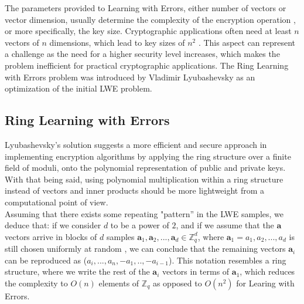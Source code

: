 \documentclass[11pt,
  titlepage=false,
  abstract=on,
]{scrreprt}
\begin{document}
The parameters provided to Learning with Errors, either number of vectors or vector dimension, usually determine the complexity of the encryption operation \cite{micciancio2013hardness}, or more specifically, the key size. 
Cryptographic applications often need at least  $n$ vectors of $n$ dimensions, which lead to key sizes of $n^2$ \cite{regev2010learning}. This aspect can represent a challenge as the need for a higher 
security level increases, which makes the problem inefficient for practical cryptographic applications.
The Ring Learning with Errors problem \cite{lyubashevsky2010ideal} was introduced by Vladimir Lyubashevsky as an optimization of the initial LWE problem.


\subsection{Ring Learning with Errors}
Lyubashevsky's solution \cite{lyubashevsky2010ideal} suggests a more efficient and secure approach in implementing encryption algorithms by applying the ring structure over a finite field of moduli, onto the polynomial representation 
of public and private keys. With that being said, using polynomial multiplication within a ring structure instead of vectors and inner products should be more lightweight from a computational point of view.\\

Assuming that there exists some repeating "pattern'' in the LWE samples, we deduce that: if we consider $d$ to be a power of $2$, and if we assume that the $\mathbf{a}$ vectors arrive in blocks of $d$ samples
$\mathbf{a}_1, \mathbf{a}_2,..., \mathbf{a}_d \in \mathbb{Z}^d_q$, where $\mathbf{a}_1 = a_1, a_2,..., a_d$ is still chosen uniformly at random , we can conclude that the remaining vectors $\mathbf{a}_i$
can be reproduced as ($a_i,..., a_n, -a_1,..,-a_{i-1}$). This notation resembles a ring structure, where we write the rest of the $\mathbf{a}_i$ vectors in terms of $\mathbf{a}_1$, which reduces the 
complexity to $O(n)$ elements of $\mathbb{Z}_q$ as opposed to $O(n^2)$ for Learing with Errors.
\end{document}
